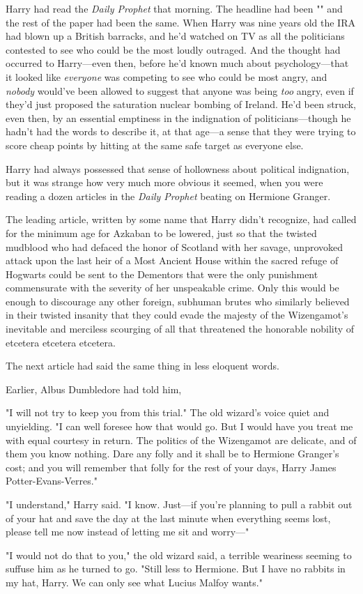 Harry had read the \emph{Daily Prophet} that morning. The headline had been
"" and the rest of the paper had been
the same. When Harry was nine years old the IRA had blown up a British
barracks, and he'd watched on TV as all the politicians contested to see who
could be the most loudly outraged. And the thought had occurred to Harry—even
then, before he'd known much about psychology—that it looked like
\emph{everyone} was competing to see who could be most angry, and \emph{nobody}
would've been allowed to suggest that anyone was being \emph{too} angry, even
if they'd just proposed the saturation nuclear bombing of Ireland. He'd been
struck, even then, by an essential emptiness in the indignation of
politicians—though he hadn't had the words to describe it, at that age—a
sense that they were trying to score cheap points by hitting at the same safe
target as everyone else.

Harry had always possessed that sense of hollowness about political
indignation, but it was strange how very much more obvious it seemed, when you
were reading a dozen articles in the \emph{Daily Prophet} beating on Hermione
Granger.

The leading article, written by some name that Harry didn't recognize, had
called for the minimum age for Azkaban to be lowered, just so that the twisted
mudblood who had defaced the honor of Scotland with her savage, unprovoked
attack upon the last heir of a Most Ancient House within the sacred refuge of
Hogwarts could be sent to the Dementors that were the only punishment
commensurate with the severity of her unspeakable crime. Only this would be
enough to discourage any other foreign, subhuman brutes who similarly believed
in their twisted insanity that they could evade the majesty of the Wizengamot's
inevitable and merciless scourging of all that threatened the honorable
nobility of etcetera etcetera etcetera.

The next article had said the same thing in less eloquent words.

Earlier, Albus Dumbledore had told him,

\begin{em}
"I will not try to keep you from this trial." The old wizard's voice
quiet and unyielding. "I can well foresee how that would go. But I would have
you treat me with equal courtesy in return. The politics of the Wizengamot are
delicate, and of them you know nothing. Dare any folly and it shall be to
Hermione Granger's cost; and you will remember that folly for the rest of your
days, Harry James Potter-Evans-Verres."

"I understand," Harry said. "I know. Just—if you're planning to pull a
rabbit out of your hat and save the day at the last minute when everything
seems lost, please tell me now instead of letting me sit and worry—"

"I would not do that to you," the old wizard said, a terrible weariness
seeming to suffuse him as he turned to go. "Still less to Hermione. But I have
no rabbits in my hat, Harry. We can only see what Lucius Malfoy wants."
\end{em}

